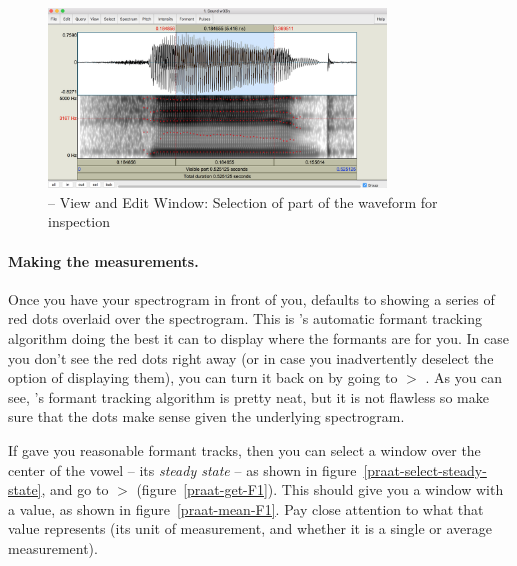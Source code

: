 \begin{figure}[!tbp]
\caption{\Praat{} -- View and Edit Window: Selection of part of the waveform for inspection}
\label{praat-select-part-of-sound}
	\begin{center}
		\includegraphics[width=0.8\textwidth]{./figures/Praat-06-Select-portion-of-sound}
	\end{center}
\end{figure}



\paragraph{Making the measurements.} Once you have your spectrogram in front of you, \Praat{} defaults to showing a series of red dots overlaid over the spectrogram. This is \Praat{}'s automatic formant tracking algorithm doing the best it can to display where the formants are for you. In case you don't see the red dots right away (or in case you inadvertently deselect the option of displaying them), you can turn it back on by going to  $>$ . As you can see, \Praat{}'s formant tracking algorithm is pretty neat, but it is not flawless so make sure that the dots make sense given the underlying spectrogram.

If \Praat{} gave you reasonable formant tracks, then you can select a window over the center of the vowel -- its \emph{steady state} -- as shown in figure~\ref{praat-select-steady-state}, and go to  $>$  (figure~\ref{praat-get-F1}). This should give you a window with a value, as shown in figure~\ref{praat-mean-F1}. Pay close attention to what that value represents (its unit of measurement, and whether it is a single or average measurement).

